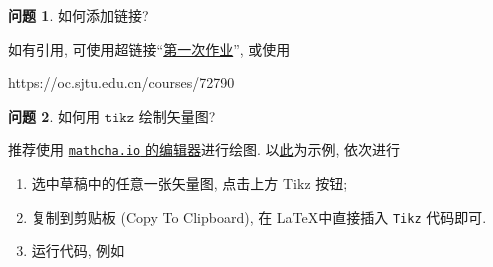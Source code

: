 \documentclass[11pt]{ctexart}
\theoremstyle{definition}
\newtheorem{qqq}{问题}[section]
\numberwithin{equation}{section}
\begin{document}
\begin{qqq}
    如何添加链接?
    \begin{aaa}
        如有引用, 可使用超链接``\href{https://oc.sjtu.edu.cn/courses/72790/assignments/302404}{第一次作业}'', 或使用
        \begin{llll}
            https://oc.sjtu.edu.cn/courses/72790
        \end{llll}
    \end{aaa}
\end{qqq}

\begin{qqq}
    如何用 $\texttt{tikz}$ 绘制矢量图?
    \begin{aaa}
        推荐使用 \href{https://www.mathcha.io/editor}{\texttt{mathcha.io} 的编辑器}进行绘图. 以\href{https://www.mathcha.io/editor/Gjoo6IZYtkXHB3t5MkKrxFQ6yowKfqkok8PUd8w7O}{此}为示例, 依次进行
        \begin{enumerate}
            \item 选中草稿中的任意一张矢量图, 点击上方 \textsf{Tikz} 按钮;
            \item 复制到剪贴板 (\textsf{Copy To Clipboard}), 在 \LaTeX 中直接插入 \texttt{Tikz} 代码即可.
            \item 运行代码, 例如 %
                  \begin{center}
                      \begin{tikzpicture}[x=0.75pt,y=0.75pt,yscale=-1,xscale=1]


\end{tikzpicture}
\end{center}
\end{enumerate}
\end{aaa}
\end{qqq}
\end{document}
